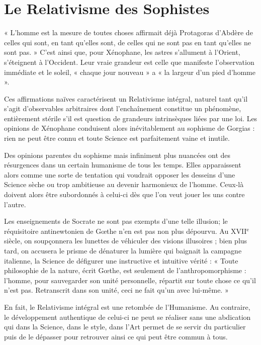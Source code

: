 \section{Le Relativisme des Sophistes}

« L'homme est la mesure de toutes choses affirmait déjà Protagoras
d’Abdère
de celles qui sont, en tant qu’elles sont, de celles qui ne
sont pas en tant qu’elles ne sont pas. » C’est ainsi que, pour Xénophane,
les astres s’allument à l’Orient, s’éteignent à l’Occident. Leur vraie
grandeur est celle que manifeste l’observation immédiate et le soleil,
« chaque jour nouveau »
a « la largeur d’un pied d’homme ».

Ces affirmations naïves caractérisent un Relativisme intégral, naturel
tant qu’il s’agit d’observables arbitraires dont l’enchaînement constitue
un phénomène, entièrement stérile s’il est question de grandeurs intrinsèques
liées par une loi. Les opinions de Xénophane conduisent alors
inévitablement au sophisme de Gorgias : rien ne peut être connu et toute
Science est parfaitement vaine et inutile.

Des opinions parentes du sophisme mais infiniment plus nuancées
ont des résurgences dans un certain humanisme de tous les temps. Elles
apparaissent alors comme une sorte de tentation qui voudrait opposer
les desseins d’une Science sèche ou trop ambitieuse au devenir harmonieux
de l’homme. Ceux-là doivent alors être subordonnés à celui-ci dès
que l’on veut jouer les uns contre l’autre.

Les enseignements de Socrate ne sont pas exempts d’une telle illusion;
le réquisitoire antinewtonien de Gœthe n’en est pas non plus dépourvu.
Au {\footnotesize XVII}$^\text{e}$ siècle, on soupçonnera les lunettes de véhiculer des visions
illusoires ; bien plus tard, on accusera le prisme de dénaturer la lumière
qui baignait la campagne italienne, la Science de défigurer une instructive
et intuitive vérité : « Toute philosophie de la nature, écrit Gœthe, est
seulement de l’anthropomorphisme : l’homme, pour sauvegarder son
unité personnelle, répartit sur toute chose ce qu’il n’est pas. Retranscrit
dans son unité, ceci ne fait qu’un avec lui-même. »

En fait, le Relativisme intégral est une retombée de l’Humanisme. Au
contraire, le développement authentique de celui-ci ne peut se réaliser
sans une abdication qui dans la Science, dans le style, dans l’Art permet
de se servir du particulier puis de le dépasser pour retrouver ainsi ce qui
peut être commun à tous.

